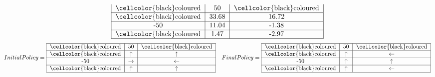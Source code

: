 \documentclass[letter, 10pt]{article}
\begin{document}
\begin{itemize}
\begin{equation*}
\begin{tabular}{ |c|c|c| }
                                    \cellcolor{black}coloured & 50 & \cellcolor{black}coloured\\
                                    \hline
                                    \cellcolor{black}coloured & 33.68 & 16.72\\
                                    \hline
                                    -50 & 11.04 & -1.38\\
                                    \hline
                                    \cellcolor{black}coloured & 1.47 & -2.97\\
                                    \hline
                                    \end{tabular}
                \end{equation*}
                \begin{equation*}
                    Initial Policy = \begin{tabular}{ |c|c|c| } 
                                    \hline
                                    \cellcolor{black}coloured & 50 & \cellcolor{black}coloured\\
                                    \hline
                                    \cellcolor{black}coloured & $\uparrow$ & $\uparrow$\\
                                    \hline
                                    -50 & $\rightarrow$ & $\leftarrow$\\
                                    \hline
                                    \cellcolor{black}coloured & $\uparrow$ & $\uparrow$\\
                                    \hline
                                    \end{tabular}\quad 
                    Final Policy =   \begin{tabular}{ |c|c|c| } 
                                    \hline
                                    \cellcolor{black}coloured & 50 & \cellcolor{black}coloured\\
                                    \hline
                                    \cellcolor{black}coloured & $\uparrow$ & $\leftarrow$\\
                                    \hline
                                    -50 & $\uparrow$ & $\uparrow$\\
                                    \hline
                                    \cellcolor{black}coloured & $\uparrow$ & $\leftarrow$\\
                                    \hline

\end{tabular}
\end{equation*}
\end{itemize}
\end{document}

